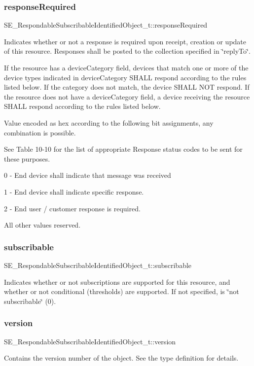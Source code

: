 \subsubsection{\texorpdfstring{response\+Required}{responseRequired}}
{\footnotesize\ttfamily S\+E\+\_\+\+Respondable\+Subscribable\+Identified\+Object\+\_\+t\+::response\+Required}

Indicates whether or not a response is required upon receipt, creation or update of this resource. Responses shall be posted to the collection specified in \char`\"{}reply\+To\char`\"{}.

If the resource has a device\+Category field, devices that match one or more of the device types indicated in device\+Category S\+H\+A\+LL respond according to the rules listed below. If the category does not match, the device S\+H\+A\+LL N\+OT respond. If the resource does not have a device\+Category field, a device receiving the resource S\+H\+A\+LL respond according to the rules listed below.

Value encoded as hex according to the following bit assignments, any combination is possible.

See Table 10-\/10 for the list of appropriate Response status codes to be sent for these purposes.

0 -\/ End device shall indicate that message was received

1 -\/ End device shall indicate specific response.

2 -\/ End user / customer response is required.

All other values reserved. \mbox{\label{group__RespondableSubscribableIdentifiedObject_ga5c1d53f218cacfd624c053684090d4a8}} 
\subsubsection{\texorpdfstring{subscribable}{subscribable}}
{\footnotesize\ttfamily S\+E\+\_\+\+Respondable\+Subscribable\+Identified\+Object\+\_\+t\+::subscribable}

Indicates whether or not subscriptions are supported for this resource, and whether or not conditional (thresholds) are supported. If not specified, is \char`\"{}not subscribable\char`\"{} (0). \mbox{\label{group__RespondableSubscribableIdentifiedObject_ga5479f5b7d65fae80406692691cdbf2f7}} 
\subsubsection{\texorpdfstring{version}{version}}
{\footnotesize\ttfamily S\+E\+\_\+\+Respondable\+Subscribable\+Identified\+Object\+\_\+t\+::version}

Contains the version number of the object. See the type definition for details. 